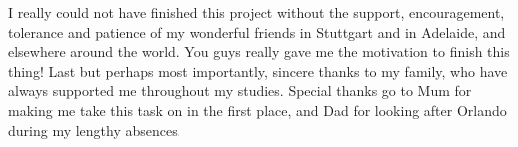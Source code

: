 I really could not have finished this project without the support, encouragement, tolerance and patience of my wonderful friends in Stuttgart and in Adelaide, and elsewhere around the world. You guys really gave me the motivation to finish this thing! Last but perhaps most importantly, sincere thanks to my family, who have always supported me throughout my studies. Special thanks go to Mum for making me take this task on in the first place, and Dad for looking after Orlando during my lengthy absences\includegraphics[height=0.5mm]{images/homer_simpson.pdf}%